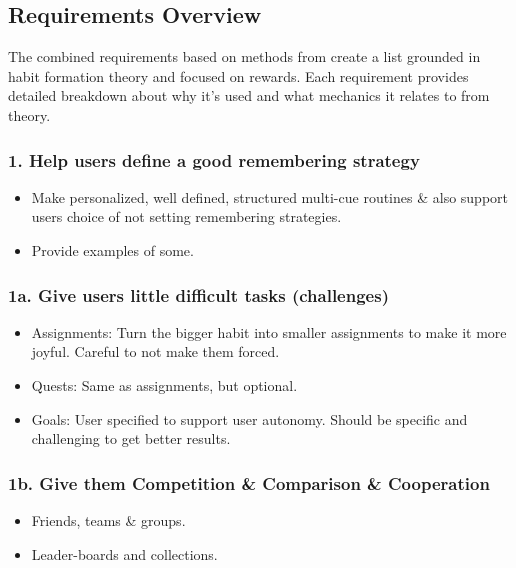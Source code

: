 \newpage

\subsection{Requirements Overview}

The combined requirements based on methods from \cite{thesis_kathy, article_taxonomy_motivational_affordances_meaningful} create a list grounded in habit formation theory and focused on rewards. Each requirement provides detailed breakdown about why it's used and what mechanics it relates to from theory.

\subsubsection*{1. Help users define a good remembering strategy}
  \begin{itemize}
    \item Make personalized, well defined, structured multi-cue routines \& also support users choice of not setting remembering strategies.
    \item Provide examples of some.
  \end{itemize}

\subsubsection*{1a. Give users little difficult tasks (challenges)}
  \begin{itemize}
    \item Assignments: Turn the bigger habit into smaller assignments to make it more joyful. Careful to not make them forced.
    \item Quests: Same as assignments, but optional.
    \item Goals: User specified to support user autonomy. Should be specific and challenging to get better results.
  \end{itemize}

\subsubsection*{1b. Give them Competition \& Comparison \& Cooperation}
  \begin{itemize}
    \item Friends, teams \& groups.
    \item Leader-boards and collections.
  \end{itemize}

